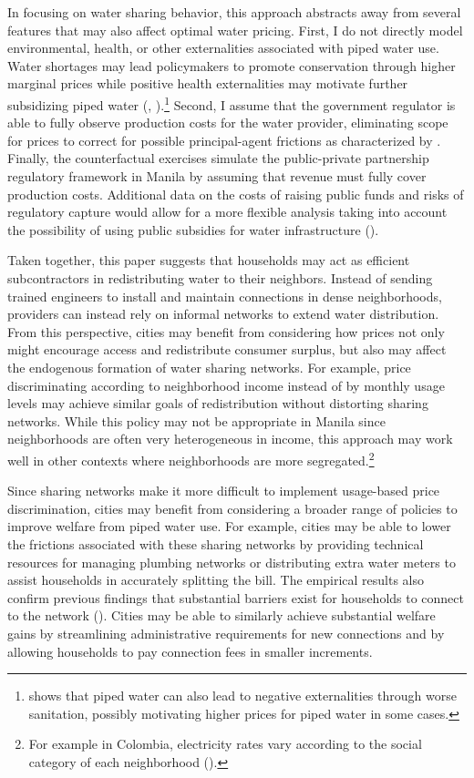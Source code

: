 \documentclass[12pt]{article}
\begin{document}
In focusing on water sharing behavior, this approach abstracts away from several features that may also affect optimal water pricing.  First, I do not directly model environmental, health, or other externalities associated with piped water use.  Water shortages may lead policymakers to promote conservation through higher marginal prices while positive health externalities may motivate further subsidizing piped water (\cite{timmins2002measuring}, \cite{galiani2005water}).\footnote{\cite{bennett2012does} shows that piped water can also lead to negative externalities through worse sanitation, possibly motivating higher prices for piped water in some cases.}  Second, I assume that the government regulator is able to fully observe production costs for the water provider, eliminating scope for prices to correct for possible principal-agent frictions as characterized by \cite{laffont1993theory}.  Finally, the counterfactual exercises simulate the public-private partnership regulatory framework in Manila by assuming that revenue must fully cover production costs.  Additional data on the costs of raising public funds and risks of regulatory capture would allow for a more flexible analysis taking into account the possibility of using public subsidies for water infrastructure (\cite{laffont2005regulation}).  

Taken together, this paper suggests that households may act as efficient subcontractors in redistributing water to their neighbors.  Instead of sending trained engineers to install and maintain connections in dense neighborhoods, providers can instead rely on informal networks to extend water distribution.  From this perspective, cities may benefit from considering how prices not only might encourage access and redistribute consumer surplus, but also may affect the endogenous formation of water sharing networks.  For example, price discriminating according to neighborhood income instead of by monthly usage levels may achieve similar goals of redistribution without distorting sharing networks.  While this policy may not be appropriate in Manila since neighborhoods are often very heterogeneous in income, this approach may work well in other contexts where neighborhoods are more segregated.\footnote{For example in Colombia, electricity rates vary according to the social category of each neighborhood (\cite{mcrae2014infrastructure}).} 

Since sharing networks make it more difficult to implement usage-based price discrimination, cities may benefit from considering a broader range of policies to improve welfare from piped water use.  For example, cities may be able to lower the frictions associated with these sharing networks by providing technical resources for managing plumbing networks or distributing extra water meters to assist households in accurately splitting the bill.  The empirical results also confirm previous findings that substantial barriers exist for households to connect to the network (\cite{devoto2012happiness}).  Cities may be able to similarly achieve substantial welfare gains by streamlining administrative requirements for new connections and by allowing households to pay connection fees in smaller increments.  
\end{document}
